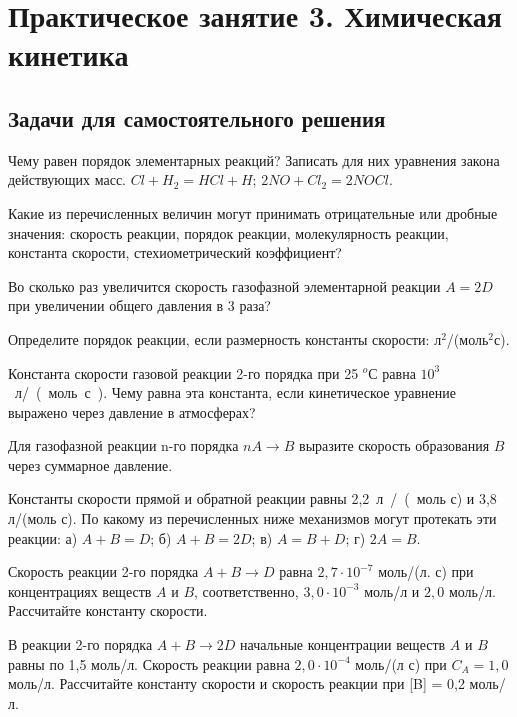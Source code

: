 \chapter{Практическое занятие 3. Химическая кинетика}
\section{Задачи для самостоятельного решения}
\begin{Task}
Чему равен порядок элементарных реакций? Записать для них уравнения закона действующих масс.
$Cl + H_{2} = HCl + H$; $2NO + Cl_{2} = 2NOCl$.
\end{Task}
\begin{Task}
Какие из перечисленных величин могут принимать отрицательные или дробные значения: скорость реакции, порядок реакции, молекулярность реакции, константа скорости, стехиометрический коэффициент?
\end{Task}
\begin{Task}
 Во сколько раз увеличится скорость газофазной элементарной реакции $A = 2D$ при увеличении общего давления в 3 раза?
\end{Task}
\begin{Task}
Определите порядок реакции, если размерность константы скорости: л$^{2}$/(моль$^{2}$с).
\end{Task}
\begin{Task}
Константа скорости газовой реакции 2-го порядка при 25 $^{o}$С равна $10^{3}$~л/~(~моль~с~). Чему равна эта константа, если кинетическое уравнение выражено через давление в атмосферах? 
\end{Task}
\begin{Task}
Для газофазной реакции n-го порядка $nA\rightarrow B$ выразите скорость образования $B$ через суммарное давление.
\end{Task}
\begin{Task}
Константы скорости прямой и обратной реакции равны 2,2~л~/~(~моль с) и 3,8 л/(моль с). По какому из перечисленных ниже механизмов могут протекать эти реакции: а) $A + B = D$; б) $A+ B = 2D$; в) $A = B + D$; г) $2A = B$. 
\end{Task}
\begin{Task}
Скорость реакции 2-го порядка $A + B\rightarrow D$ равна $2,7\cdot 10^{-7}$ моль/(л. с) при концентрациях веществ $A$ и $B$, соответственно, $3,0\cdot 10^{-3}$ моль/л и $2,0$ моль/л. Рассчитайте константу скорости. 
\end{Task}
\begin{Task}
В реакции 2-го порядка $A + B\rightarrow 2D$ начальные концентрации веществ $A$ и $B$ равны по 1,5 моль/л. Скорость реакции равна $2,0\cdot 10^{-4}$ моль/(л с) при $C_{A} = 1,0$ моль/л. Рассчитайте константу скорости и скорость реакции при [B] = 0,2 моль/л.  
\end{Task}
